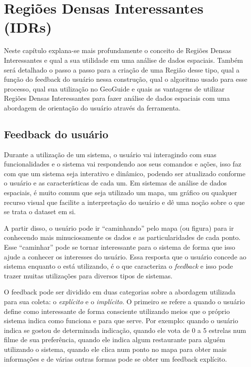\chapter{Regiões Densas Interessantes (IDRs)}
\label{chap:idrs}

Neste capítulo explana-se mais profundamente o conceito de Regiões Densas Interessantes e qual a sua utilidade em uma análise de dados espaciais. Também será detalhado o passo a passo para a criação de uma Região desse tipo, qual a função do feedback do usuário nessa construção, qual o algoritmo usado para esse processo, qual sua utilização no GeoGuide e quais as vantagens de utilizar Regiões Densas Interessantes para fazer análise de dados espaciais com uma abordagem de orientação do usuário através da ferramenta.

\section{Feedback do usuário}

Durante a utilização de um sistema, o usuário vai interagindo com suas funcionalidades e o sistema vai respondendo aos seus comandos e ações, isso faz com que um sistema seja interativo e dinâmico, podendo ser atualizado conforme o usuário e as características de cada um. Em sistemas de análise de dados espaciais, é muito comum que seja utilizado um mapa, um gráfico ou qualquer recurso visual que facilite a interpretação do usuário e dê uma noção sobre o que se trata o dataset em si.

A partir disso, o usuário pode ir ``caminhando'' pelo mapa (ou figura) para ir conhecendo mais minuciosamente os dados e as particularidades de cada ponto. Esse ``caminhar'' pode se tornar interessante para o sistema de forma que isso ajude a conhecer os interesses do usuário. Essa resposta que o usuário concede ao sistema enquanto o está utilizando, é o que caracteriza o \textit{feedback} e isso pode trazer muitas utilizações para diversos tipos de sistemas.

O feedback pode ser dividido em duas categorias sobre a abordagem utilizada para sua coleta: o \textit{explícito} e o \textit{implícito}. O primeiro se refere a quando o usuário define como interessante de forma consciente utilizando meios que o próprio sistema indica como funciona e para que serve. Por exemplo: quando o usuário indica se gostou de determinada indicação, quando ele vota de 0 a 5 estrelas num filme de sua preferência, quando ele indica algum restaurante para alguém utilizando o sistema, quando ele clica num ponto no mapa para obter mais informações e de várias outras formas pode se obter um feedback explícito.

